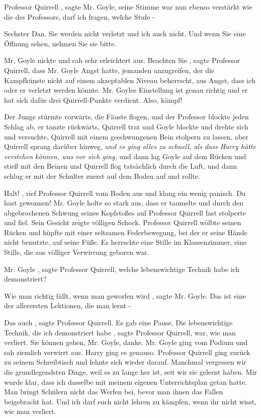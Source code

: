\glqq Professor Quirrell\grqq{} , sagte Mr. Goyle, seine Stimme war nun ebenso
verstärkt wie die des Professors, \glqq darf ich fragen, welche Stufe -\grqq{}

\glqq Sechster Dan. Sie werden nicht verletzt und ich auch nicht. Und wenn Sie
eine Öffnung sehen, nehmen Sie sie bitte.\grqq{}

Mr. Goyle nickte und sah sehr erleichtert aus. \glqq Beachten Sie\grqq{} , sagte
Professor Quirrell, \glqq dass Mr. Goyle Angst hatte, jemanden anzugreifen, der
die Kampfkünste nicht auf einem akzeptablen Niveau beherrscht, aus Angst, dass
ich oder er verletzt werden könnte. Mr. Goyles Einstellung ist genau richtig und
er hat sich dafür drei Quirrell-Punkte verdient. Also, kämpf!\grqq{}

Der Junge stürmte vorwärts, die Fäuste flogen, und der Professor blockte jeden
Schlag ab, er tanzte rückwärts, Quirrell trat und Goyle blockte und drehte sich
und versuchte, Quirrell mit einem geschwungenen Bein stolpern zu lassen, aber
Quirrell sprang darüber hinweg, \emph{und es ging alles zu schnell, als dass
Harry hätte verstehen können, was vor sich ging,} und dann lag Goyle auf dem
Rücken und stieß mit den Beinen und Quirrell flog tatsächlich durch die Luft,
und dann schlug er mit der Schulter zuerst auf dem Boden auf und rollte.

\glqq Halt!\grqq{} , rief Professor Quirrell vom Boden aus und klang ein wenig
panisch. \glqq Du hast gewonnen!\grqq{} Mr. Goyle holte so stark aus, dass er
taumelte und durch den abgebrochenen Schwung seines Kopfstoßes auf Professor
Quirrell fast stolperte und fiel. Sein Gesicht zeigte völligen Schock. Professor
Quirrell wölbte seinen Rücken und hüpfte mit einer seltsamen Federbewegung, bei
der er seine Hände nicht benutzte, auf seine Füße. Es herrschte eine Stille im
Klassenzimmer, eine Stille, die aus völliger Verwirrung geboren war.

\glqq Mr. Goyle\grqq{} , sagte Professor Quirrell, \glqq welche lebenswichtige
Technik habe ich demonstriert?\grqq{}

\glqq Wie man richtig fällt, wenn man geworfen wird\grqq{} , sagte Mr. Goyle.
\glqq Das ist eine der allerersten Lektionen, die man lernt -\grqq{}

\glqq Das auch\grqq{} , sagte Professor Quirrell. Es gab eine Pause. \glqq Die
lebenswichtige Technik, die ich demonstriert habe\grqq{} , sagte Professor
Quirrell, \glqq war, wie man verliert. Sie können gehen, Mr. Goyle,
danke.\grqq{} Mr. Goyle ging vom Podium und sah ziemlich verwirrt aus. Harry
ging es genauso. Professor Quirrell ging zurück zu seinem Schreibtisch und
lehnte sich wieder darauf. \glqq Manchmal vergessen wir die grundlegendsten
Dinge, weil es zu lange her ist, seit wir sie gelernt haben. Mir wurde klar,
dass ich dasselbe mit meinem eigenen Unterrichtsplan getan hatte. Man bringt
Schülern nicht das Werfen bei, bevor man ihnen das Fallen beigebracht hat. Und
ich darf euch nicht lehren zu kämpfen, wenn ihr nicht wisst, wie man
verliert.\grqq{}

